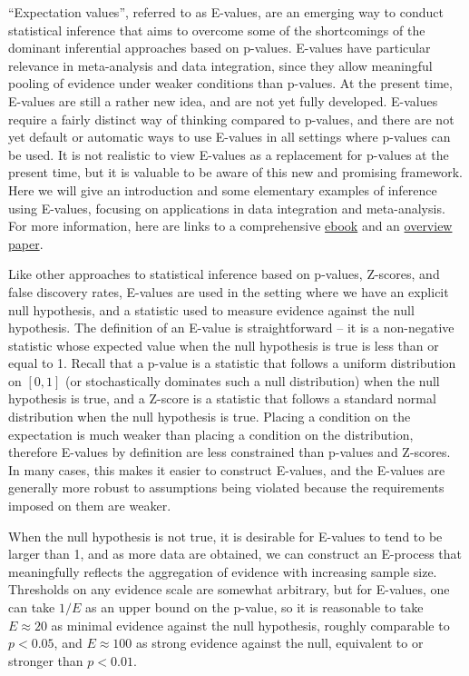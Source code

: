 ``Expectation values'', referred to as E-values, are an emerging way to conduct statistical inference that aims to overcome some of the shortcomings of the dominant inferential approaches based on p-values. E-values have particular relevance in meta-analysis and data integration, since they allow meaningful pooling of evidence under weaker conditions than p-values. At the present time, E-values are still a rather new idea, and are not yet fully developed. E-values require a fairly distinct way of thinking compared to p-values, and there are not yet default or automatic ways to use E-values in all settings where p-values can be used. It is not realistic to view E-values as a replacement for p-values at the present time, but it is valuable to be aware of this new and promising framework. Here we will give an introduction and some elementary examples of inference using E-values, focusing on applications in data integration and meta-analysis. For more information, here are links to a comprehensive \href{https://stat.cmu.edu/~aramdas/ebook-final.pdf}{ebook} and an \href{https://www.pnas.org/doi/10.1073/pnas.2302098121#st7}{overview paper}.

Like other approaches to statistical inference based on p-values, Z-scores, and false discovery rates, E-values are used in the setting where we have an explicit null hypothesis, and a statistic used to measure evidence against the null hypothesis. The definition of an E-value is straightforward -- it is a non-negative statistic whose expected value when the null hypothesis is true is less than or equal to 1. Recall that a p-value is a statistic that follows a uniform distribution on $[0, 1]$ (or stochastically dominates such a null distribution) when the null hypothesis is true, and a Z-score is a statistic that follows a standard normal distribution when the null hypothesis is true. Placing a condition on the expectation is much weaker than placing a condition on the distribution, therefore E-values by definition are less constrained than p-values and Z-scores. In many cases, this makes it easier to construct E-values, and the E-values are generally more robust to assumptions being violated because the requirements imposed on them are weaker.

When the null hypothesis is not true, it is desirable for E-values to tend to be larger than 1, and as more data are obtained, we can construct an E-process that meaningfully reflects the aggregation of evidence with increasing sample size. Thresholds on any evidence scale are somewhat arbitrary, but for E-values, one can take $1/E$ as an upper bound on the p-value, so it is reasonable to take $E\approx 20$ as minimal evidence against the null hypothesis, roughly comparable to $p < 0.05$, and $E \approx 100$ as strong evidence against the null, equivalent to or stronger than $p < 0.01$.

